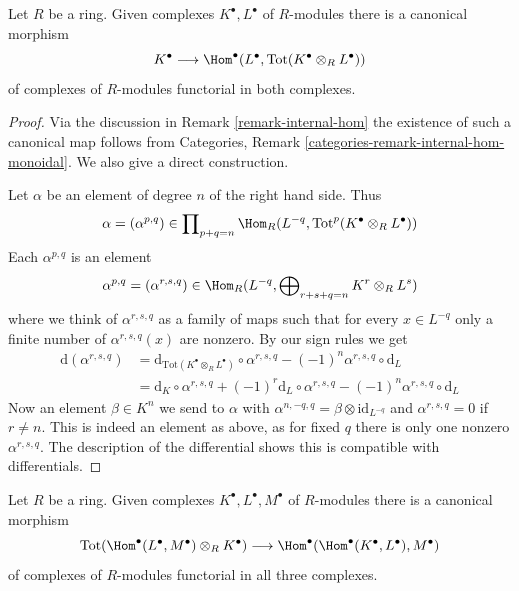 \begin{lemma}
\label{lemma-diagonal}
Let $R$ be a ring. Given complexes $K^\bullet, L^\bullet$
of $R$-modules there is a canonical morphism
$$
K^\bullet
\longrightarrow
\Hom^\bullet(L^\bullet, \text{Tot}(K^\bullet \otimes_R L^\bullet))
$$
of complexes of $R$-modules functorial in both complexes.
\end{lemma}

\begin{proof}
Via the discussion in Remark \ref{remark-internal-hom} the existence
of such a canonical map follows from
Categories, Remark \ref{categories-remark-internal-hom-monoidal}.
We also give a direct construction.

\medskip\noindent
Let $\alpha$ be an element of degree $n$ of the right hand side.
Thus
$$
\alpha = (\alpha^{p, q}) \in \prod\nolimits_{p + q = n}
\Hom_R(L^{-q}, \text{Tot}^p(K^\bullet \otimes_R L^\bullet))
$$
Each $\alpha^{p, q}$ is an element
$$
\alpha^{p, q} = (\alpha^{r, s, q}) \in
\Hom_R(L^{-q}, \bigoplus\nolimits_{r + s + q = n} K^r \otimes_R L^s)
$$
where we think of $\alpha^{r, s, q}$ as a family of maps such that
for every $x \in L^{-q}$ only a finite number of
$\alpha^{r, s, q}(x)$ are nonzero. By our sign rules we get
\begin{align*}
\text{d}(\alpha^{r, s, q})
& =
\text{d}_{\text{Tot}(K^\bullet \otimes_R L^\bullet)} \circ \alpha^{r, s, q}
- (-1)^n \alpha^{r, s, q} \circ \text{d}_L \\
& =
\text{d}_K \circ \alpha^{r, s, q} + (-1)^r \text{d}_L \circ \alpha^{r, s, q}
- (-1)^n \alpha^{r, s, q} \circ \text{d}_L
\end{align*}
Now an element $\beta \in K^n$ we send to $\alpha$ with
$\alpha^{n, -q, q} = \beta \otimes \text{id}_{L^{-q}}$
and $\alpha^{r, s, q} = 0$ if $r \not = n$. This is indeed
an element as above, as for fixed $q$ there is only one nonzero
$\alpha^{r, s, q}$. The description of
the differential shows this is compatible with differentials.
\end{proof}

\begin{lemma}
\label{lemma-evaluate-and-more}
Let $R$ be a ring. Given complexes $K^\bullet, L^\bullet, M^\bullet$
of $R$-modules there is a canonical morphism
$$
\text{Tot}(\Hom^\bullet(L^\bullet, M^\bullet) \otimes_R K^\bullet)
\longrightarrow
\Hom^\bullet(\Hom^\bullet(K^\bullet, L^\bullet), M^\bullet)
$$
of complexes of $R$-modules functorial in all three complexes.
\end{lemma}

